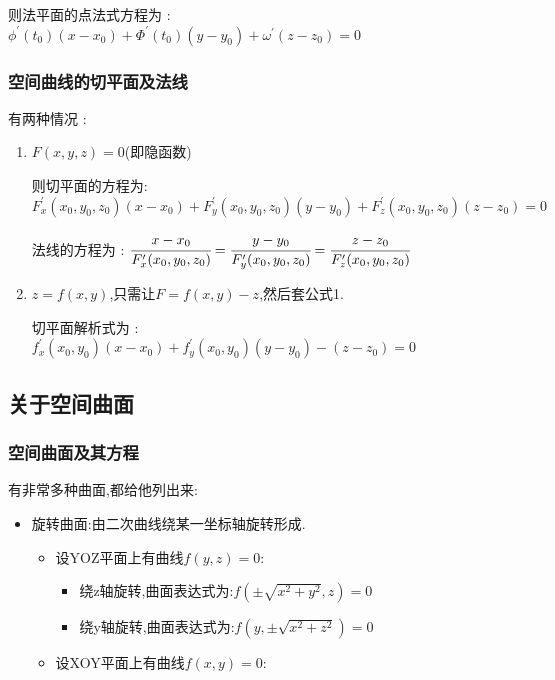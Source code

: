 \documentclass[UTF8,12pt]{ctexbook}
\newcommand{\derivative}{^\prime}
\newcommand{\defFunction}[1]{f(#1)}
\begin{document}
{{{{      则法平面的点法式方程为 : $\phi\derivative(t_0)(x - x_0) + \Phi\derivative(t_0)(y - y_0) + \omega\derivative(z - z_0) = 0$
    }%

    \subsubsection{空间曲线的切平面及法线}{
      有两种情况 :

      \begin{enumerate}
        \item {
              $F(x,y,z) = 0$(即隐函数)

              则切平面的方程为:$F\derivative_x(x_0,y_0,z_0)(x - x_0) + F\derivative_y(x_0,y_0,z_0)(y - y_0) + F\derivative_z(x_0,y_0,z_0)(z - z_0) = 0$

              法线的方程为 : $\cfrac{x - x_0}{F\derivative_x(x_0,y_0,z_0)} = \cfrac{y - y_0}{F\derivative_y(x_0,y_0,z_0)} = \cfrac{z - z_0}{F\derivative_z(x_0,y_0,z_0)}$
              }
        \item {
              $z = \defFunction{x,y}$,只需让$F = \defFunction{x,y} - z$,然后套公式1.

              切平面解析式为 : $f\derivative_x(x_0,y_0)(x - x_0) + f\derivative_y(x_0,y_0)(y - y_0) - (z - z_0) = 0$
              }
      \end{enumerate}
    }%

  }%

  \subsection{关于空间曲面}{

    \subsubsection{空间曲面及其方程}{
      有非常多种曲面,都给他列出来:

      \begin{itemize}
        \item {
              旋转曲面:由二次曲线绕某一坐标轴旋转形成.

              \begin{itemize}
                \item {
                      设YOZ平面上有曲线$\defFunction{y,z} = 0$:

                      \begin{itemize}
                        \item 绕z轴旋转,曲面表达式为:$\defFunction{\pm\sqrt{x^2 + y^2},z} = 0$
                        \item 绕y轴旋转,曲面表达式为:$\defFunction{y,\pm\sqrt{x^2 + z^2}} = 0$
                      \end{itemize}
                      }
                \item {
                      设XOY平面上有曲线$\defFunction{x,y} = 0$:

}
\end{itemize}}
\end{itemize}}}}}
\end{document}
